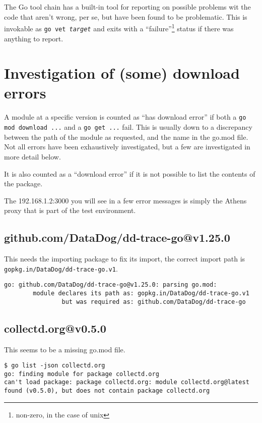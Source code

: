 \documentclass[a4paper]{paper}
\begin{document}
The Go tool chain has a built-in tool for reporting on possible
problems wit the code that aren't wrong, per se, but have been found
to be problematic. This is invokable as {\tt go vet {\it target}}
and exits with a ``failure''\footnote{non-zero, in the case of unix}
status if there was anything to report.

\section{Investigation of (some) download errors}

A module at a specific version is counted as ``has download error'' if
both a {\tt go mod download ...} and a {\tt go get ...} fail. This is
usually down to a discrepancy between the path of the module as
requested, and the name in the go.mod file. Not all errors have been
exhaustively investigated, but a few are investigated in more detail
below.

It is also counted as a ``download error'' if it is not possible to
list the contents of the package.

The 192.168.1.2:3000 you will see in a few error messages is simply
the Athens proxy that is part of the test environment.

\subsection{github.com/DataDog/dd-trace-go@v1.25.0}

This needs the importing package to fix its import, the correct import path is {\tt gopkg.in/DataDog/dd-trace-go.v1}.
\begin{verbatim}
go: github.com/DataDog/dd-trace-go@v1.25.0: parsing go.mod:
        module declares its path as: gopkg.in/DataDog/dd-trace-go.v1
                but was required as: github.com/DataDog/dd-trace-go
\end{verbatim}


\subsection{collectd.org@v0.5.0}

This seems to be a missing go.mod file.

\begin{verbatim}
$ go list -json collectd.org
go: finding module for package collectd.org
can't load package: package collectd.org: module collectd.org@latest found (v0.5.0), but does not contain package collectd.org
\end{verbatim}
\end{document}
